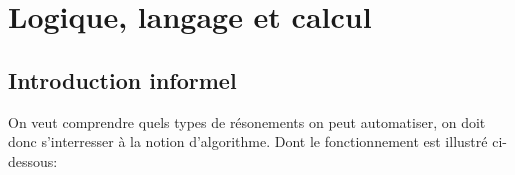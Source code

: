 \chapter{Logique, langage et calcul}

\section{Introduction informel}
On veut comprendre quels types de résonements on peut automatiser, 
on doit donc s'interresser à la notion d'algorithme. Dont le fonctionnement est illustré ci-dessous:

\begin{centering}




\begin{tikzpicture}[x=0.75pt,y=0.75pt,yscale=-1,xscale=1]


\end{tikzpicture}
\end{centering}
